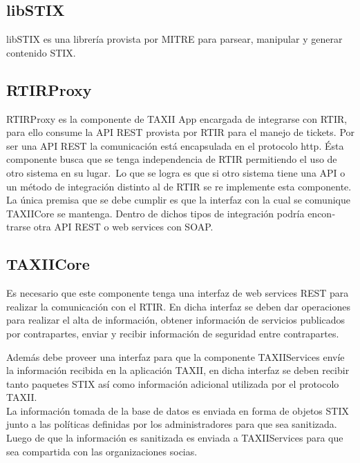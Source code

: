 	\subsection[libSTIX]{\foreignlanguage{spanish}{libSTIX}}
	\foreignlanguage{spanish}{libSTIX es una librería provista por MITRE para parsear, manipular y generar contenido STIX.}
	
	\subsection[RTIRProxy]{\foreignlanguage{spanish}{RTIRProxy}}
	\foreignlanguage{spanish}{RTIRProxy es la componente de TAXII App encargada de integrarse con RTIR, para ello consume la
		API REST provista por RTIR para el manejo de tickets. Por ser una API REST la comunicación está encapsulada en el
		protocolo http. Ésta componente busca que se tenga independencia de RTIR permitiendo el uso de otro sistema en su
		lugar.}\foreignlanguage{spanish}{\ Lo que se logra es que si otro sistema tiene una API
		o un método de integración distinto al de RTIR se re implemente esta componente. La única premisa que se debe cumplir
		es que la interfaz con la cual se comunique TAXIICore se mantenga. Dentro de dichos tipos de integración podría
		encontrarse otra API REST o web services con SOAP. }
	
	\subsection[TAXIICore]{\foreignlanguage{spanish}{TAXIICore}}
	Es necesario que este componente tenga una interfaz de web services REST para realizar la
		comunicación con el RTIR. En dicha interfaz se deben dar operaciones para realizar el alta de información, obtener
		información de servicios publicados por contrapartes, enviar y recibir información de seguridad entre contrapartes.\\
		\bigskip

	Además debe proveer una interfaz para que la componente TAXIIServices envíe la información
		recibida en la aplicación TAXII, en dicha interfaz se deben recibir tanto paquetes STIX así como información adicional
		utilizada por el protocolo TAXII. \\
	\bigskip	
	\foreignlanguage{spanish}{La información tomada de la base de datos es enviada en forma de objetos STIX junto a las
		políticas definidas por los administradores para que sea sanitizada. Luego de que la información es sanitizada es
		enviada a TAXIIServices para que sea compartida con las organizaciones socias.}
	
